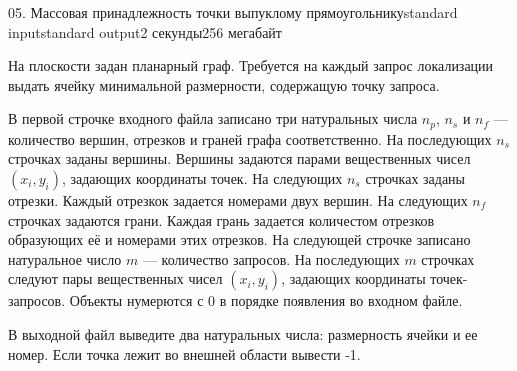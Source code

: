 \begin{problem}{05. Массовая принадлежность точки выпуклому прямоугольнику}{standard input}{standard output}{2 секунды}{256 мегабайт}

На плоскости задан планарный граф. Требуется на каждый запрос локализации выдать ячейку минимальной размерности, содержащую точку  запроса.  

\InputFile

В первой строчке входного файла записано три натуральных числа $n_p$, $n_s$ и $n_f$ --- количество вершин, отрезков и граней графа соответственно. На последующих $n_s$ строчках заданы вершины.  Вершины задаются парами вещественных чисел $(x_i, y_i)$, задающих координаты точек.   На следующих $n_s$ строчках заданы отрезки. Каждый отрезкок задается номерами двух вершин. На следующих $n_f$ строчках задаются грани. Каждая грань задается количестом отрезков образующих её и номерами этих отрезков. На следующей строчке записано натуральное число $m$ --- количество запросов. На последующих $m$ строчках следуют пары вещественных чисел $(x_i, y_i)$, задающих координаты точек-запросов. Объекты нумерются с 0 в порядке появления во входном файле.

\OutputFile 

В выходной файл выведите два натуральных числа: размерность ячейки и ее номер. Если точка лежит во внешней области вывести -1.

\Examples

\begin{example}%
%
\end{example}

\end{problem}
